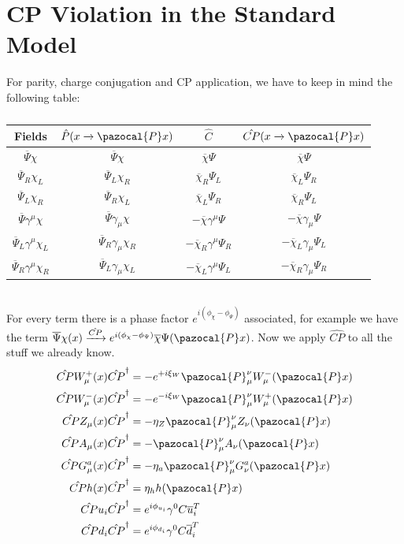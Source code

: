 \documentclass[../main.tex]{subfiles}
\begin{document}
\section{CP Violation in the Standard Model}
For parity, charge conjugation and CP application, we have to keep in mind the following table:
\begin{table}[h]
    \centering
    {\renewcommand{\arraystretch}{1}
    \begin{tabular}{c|c|c|c}
    \hline
    Fields & $\hat{P}(x\xrightarrow[]{}\pazocal{P}x)$ & $\hat{C}$ & $\hat{CP}(x\xrightarrow[]{}\pazocal{P}x)$\\
    \hline
    $\overline{\Psi}\chi$ & $\overline{\Psi}\chi$ & $\overline{\chi}\Psi$ & $\overline{\chi}\Psi$\\
    $\overline{\Psi}_R\chi_L$ & $\overline{\Psi}_L\chi_R$ & $\overline{\chi}_R\Psi_L$ & $\overline{\chi}_L\Psi_R$\\
    $\overline{\Psi}_L\chi_R$ & $\overline{\Psi}_R\chi_L$ & $\overline{\chi}_L\Psi_R$ & $\overline{\chi}_R\Psi_L$\\
    $\overline{\Psi}\gamma^\mu\chi$ & $\overline{\Psi}\gamma_\mu\chi$ & $-\overline{\chi}\gamma^\mu\Psi$ & $-\overline{\chi}\gamma_\mu\Psi$ \\
    $\overline{\Psi}_L\gamma^\mu\chi_L$ & $\overline{\Psi}_R\gamma_\mu\chi_R$ & $-\overline{\chi}_R\gamma^\mu\Psi_R$ & $-\overline{\chi}_L\gamma_\mu\Psi_L$\\
    $\overline{\Psi}_R\gamma^\mu\chi_R$ & $\overline{\Psi}_L\gamma_\mu\chi_L$ & $-\overline{\chi}_L\gamma^\mu\Psi_L$ & $-\overline{\chi}_R\gamma_\mu\Psi_R$\\
    \hline
    \end{tabular}
    }
    \caption*{}
\end{table}\\
For every term there is a phase factor $e^{i(\phi_\chi-\phi_\Psi)}$ associated, for example we have the term $\overline{\Psi}\chi(x)\xrightarrow[]{\hat{CP}}e^{i(\phi_\chi-\phi_\Psi)}\overline{\chi}\Psi(\pazocal{P}x)$. Now we apply $\hat{CP}$ to all the stuff we already know.
\[
\begin{aligned}
\hat{CP}W_\mu^+(x)\hat{CP}^\dagger&=-e^{+i\xi_W}\pazocal{P}_\mu^\nu W_\mu^-(\pazocal{P}x)\\   \hat{CP}W_\mu^-(x)\hat{CP}^\dagger &=-e^{-i\xi_W}\pazocal{P}_\mu^\nu W_\mu^+(\pazocal{P}x)\\
\hat{CP}Z_\mu(x)\hat{CP}^\dagger &=-\eta_Z\pazocal{P}_\mu^\nu Z_\nu(\pazocal{P}x)\\ \hat{CP}A_\mu(x)\hat{CP}^\dagger &=-\pazocal{P}_\mu^\nu A_\nu(\pazocal{P}x)\\
\hat{CP}G_\mu^a(x)\hat{CP}^\dagger &=-\eta_a\pazocal{P}_\mu^\nu G_\nu^a(\pazocal{P}x)\\ \hat{CP}h(x)\hat{CP}^\dagger &=\eta_h h(\pazocal{P}x)\\
\hat{CP}u_i\hat{CP}^\dagger &=e^{i\phi_{u_i}}\gamma^0C\overline{u}_i^T\\
\hat{CP}d_i\hat{CP}^\dagger &=e^{i\phi_{d_i}}\gamma^0C\overline{d}_i^T
\end{aligned}
\]
\end{document}
